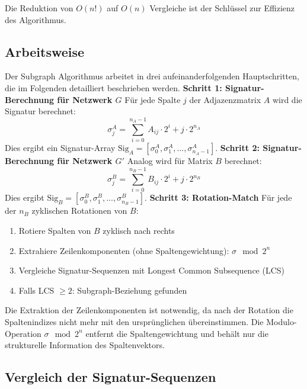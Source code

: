 ﻿\documentclass[a4paper,12pt]{article}
\theoremstyle{definition}
\begin{document}
Die Reduktion von $O(n!)$ auf $O(n)$ Vergleiche ist der Schlüssel zur Effizienz des Algorithmus.

\subsection{Arbeitsweise}

Der Subgraph Algorithmus arbeitet in drei aufeinanderfolgenden Hauptschritten, die im Folgenden detailliert beschrieben werden.\newline\newline
\textbf{Schritt 1: Signatur-Berechnung für Netzwerk $G$}\newline
Für jede Spalte $j$ der Adjazenzmatrix $A$ wird die Signatur berechnet:
\[
\sigma_j^A = \sum_{i=0}^{n_A-1} A_{ij} \cdot 2^i + j \cdot 2^{n_A}
\]
Dies ergibt ein Signatur-Array $\text{Sig}_A = [\sigma_0^A, \sigma_1^A, \ldots, \sigma_{n_A-1}^A]$.\newline\newline
\textbf{Schritt 2: Signatur-Berechnung für Netzwerk $G'$}\newline
Analog wird für Matrix $B$ berechnet:\newline
\[
\sigma_j^B = \sum_{i=0}^{n_B-1} B_{ij} \cdot 2^i + j \cdot 2^{n_B}
\]
Dies ergibt $\text{Sig}_B = [\sigma_0^B, \sigma_1^B, \ldots, \sigma_{n_B-1}^B]$.\newline\newline
\textbf{Schritt 3: Rotation-Match}\newline
Für jede der $n_B$ zyklischen Rotationen von $B$:
\begin{enumerate}
	\item Rotiere Spalten von $B$ zyklisch nach rechts
	\item Extrahiere Zeilenkomponenten (ohne Spaltengewichtung): $\sigma \mod 2^n$
	\item Vergleiche Signatur-Sequenzen mit Longest Common Subsequence (LCS)
	\item Falls LCS $\geq 2$: Subgraph-Beziehung gefunden
\end{enumerate}
Die Extraktion der Zeilenkomponenten ist notwendig, da nach der Rotation die Spaltenindizes nicht mehr mit den ursprünglichen übereinstimmen. Die Modulo-Operation $\sigma \mod 2^n$ entfernt die Spaltengewichtung und behält nur die strukturelle Information des Spaltenvektors.

\subsection{Vergleich der Signatur-Sequenzen}
\end{document}
